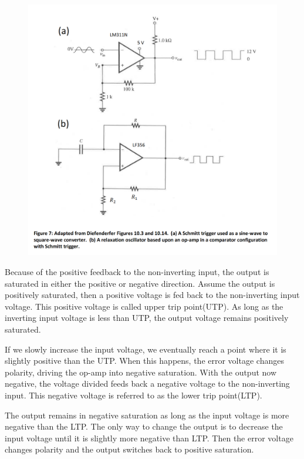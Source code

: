 \documentclass[11pt]{article}
\begin{document}
\begin{figure}[H]
 \begin{center}
  \includegraphics[width=\linewidth/1]{act56}
  \caption{}
  \label{fig:act56}
 \end{center}
\end{figure}

\vbox{}


Because of the positive feedback to the non-inverting input, the output is saturated in either the positive or negative direction. Assume the output is positively saturated, then a positive voltage is fed back to the non-inverting input voltage. This positive voltage is called upper trip point(UTP). As long as the inverting input voltage is less than UTP, the output voltage remains positively saturated. 

\vbox{}

If we slowly increase the input voltage, we eventually reach a point where it is slightly positive than the UTP. When this happens, the error voltage changes polarity, driving the op-amp into negative saturation. With the output now negative, the voltage divided feeds back a negative voltage to the non-inverting input. This negative voltage is referred to as the lower trip point(LTP).

\vbox{}

The output remains in negative saturation as long as the input voltage is more negative than the LTP. The only way to change the output is to decrease the input voltage until it is slightly more negative than LTP. Then the error voltage changes polarity and the output switches back to positive saturation.
\end{document}
